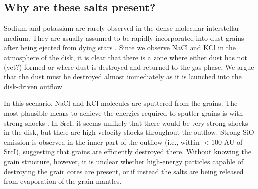 \documentclass[twocolumn]{aastex62}
\newcommand{\sourcei}{SrcI\xspace}
\begin{document}
\subsection{Why are these salts present?}

Sodium and potassium are rarely observed in the dense molecular interstellar
medium.  They are usually assumed to be rapidly incorporated into dust grains
after being ejected from dying stars \citep[e.g.,][]{Milam2007a}.  Since we
observe NaCl and KCl in the atmosphere of the disk, it is clear that
there is a zone where either dust has not (yet?) formed or
where dust is destroyed and returned to the gas phase.  We argue that the dust
must be destroyed almost immediately as it is launched into the disk-driven
outflow \citep{Hirota2017a}.







In this scenario,  NaCl and KCl molecules are sputtered from the grains.  The
most plausible means to achieve the energies required to sputter grains is with
strong shocks \citep{Schilke1997a,Decin2016a}.  In
\sourcei, it seems unlikely that there would be very strong shocks in the disk,
but there are high-velocity shocks throughout the outflow. Strong SiO emission
is observed in the inner part of the outflow (i.e., within $<100$ AU of
\sourcei), suggesting that grains are efficiently destroyed there.
Without knowing the grain structure, however, it is unclear whether high-energy
particles capable of destroying the grain cores are present, or if instead
the salts are being released from evaporation of the grain mantles.
\end{document}
